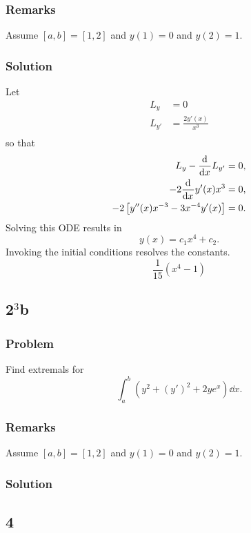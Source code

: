 \documentclass[12pt,twoside]{article}
\begin{document}
\subsubsection*{Remarks}
Assume $[a,b]=[1,2]$ and $y(1)=0$ and $y(2)=1$.

\subsubsection*{Solution}
Let
\begin{align*}
  L_y &= 0 \\
  L_{y'} &= \frac{2y'(x)}{x^3} \\
\end{align*}
so that
\begin{align*}
  L_y - \frac{\mathrm{d}^{} {}}{\mathrm{d}{x}^{}} L_{y'} &= 0, \\
  -2 \frac{\mathrm{d}^{} {}}{\mathrm{d}{x}^{}} y'(x) x^3 &= 0, \\
  -2\left[ y''(x) x^{-3}-3x^{-4}y'(x) \right] &= 0.
\end{align*}
Solving this ODE results in
\begin{equation*}
  y(x)=c_1x^4+c_2.
\end{equation*}
Invoking the initial conditions resolves the constants.
\begin{equation*}
  \boxed{\frac{1}{15}(x^4-1)}
\end{equation*}

\subsection{2$^3$b}
\subsubsection*{Problem}
Find extremals for
\begin{equation}
  \label{eq:4.3.2b-problem}
  \int_a^b(y^2+{(y')}^2 + 2ye^x)\dd{x}.
\end{equation}

\subsubsection*{Remarks}
Assume $[a,b]=[1,2]$ and $y(1)=0$ and $y(2)=1$.
\subsubsection*{Solution}
\todo{}

\subsection{4}
\end{document}
